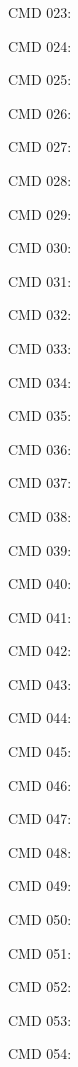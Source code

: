 \documentclass[a4paper,fleqn]{cas-dc}
\begin{document}
CMD 023: \citep{touvron2023llama}\par
CMD 024: \citep{glm2024chatglm}\par
CMD 025: \citep{ouyang2022instructgpt}\par
CMD 026: \citep{minsky1988society}\par
CMD 027: \citep{park2023generative_agents}\par
CMD 028: \citep{hong2024metagpt}\par
CMD 029: \citep{li2023camel}\par
CMD 030: \citep{zhao2024longagent,zhang2024chain_agents}\par
CMD 031: \citep{du2024multiagent_debate,chen2024reconcile,
xiong2023inter_consistency}\par
CMD 032: \citet{du2024multiagent_debate}\par
CMD 033: \citep{liang2024divergent_debate}\par
CMD 034: \citep{chen2024reconcile}\par
CMD 035: \citep{xiong2023inter_consistency}\par
CMD 036: \citep{li2023camel}\par
CMD 037: \citep{wu2024autogen}\par
CMD 038: \citep{hong2024metagpt}\par
CMD 039: \citep{qian2023chatdev}\par
CMD 040: \citep{zhao2024longagent}\par
CMD 041: \citep{zhang2024chain_agents}\par
CMD 042: \citep{jiang2026cocoa}\par
CMD 043: \citep{shen2024hugginggpt}\par
CMD 044: \citep{langgraph2024}\par
CMD 045: \citep{zhuge2024gptswarm}\par
CMD 046: \citep{chen2024agentverse}\par
CMD 047: \citep{kim2024mdagents}\par
CMD 048: \citep{langgraph2024interrupt}\par
CMD 049: \citet{du2024multiagent_debate}\par
CMD 050: \citep{li2023camel}\par
CMD 051: \citep{wu2024autogen}\par
CMD 052: \citep{hong2024metagpt}\par
CMD 053: \citep{zhao2024longagent,zhang2024chain_agents,jiang2026cocoa}\par
CMD 054: \citep{zhuge2024gptswarm,langgraph2024}\par
\end{document}
